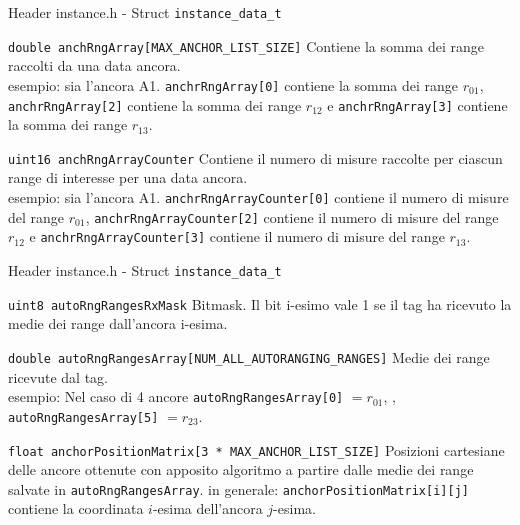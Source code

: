 \begin{frame}[fragile]{Header instance.h - Struct \lstinline!instance_data_t!}
  \begin{block}{\lstinline!double anchRngArray[MAX_ANCHOR_LIST_SIZE]!}
    Contiene la somma dei range raccolti da una data ancora.\\
    \textcolor{dgreen}{esempio:} sia l'ancora A1. \lstinline!anchrRngArray[0]! contiene la somma dei range $r_{01}$,
    \lstinline!anchrRngArray[2]! contiene la somma dei range $r_{12}$ e \lstinline!anchrRngArray[3]! contiene la somma dei range $r_{13}$.
  \end{block}
  \begin{block}{\lstinline!uint16 anchRngArrayCounter!}
    Contiene il numero di misure raccolte per ciascun range di interesse per una data ancora.\\
    \textcolor{dgreen}{esempio:} sia l'ancora A1. \lstinline!anchrRngArrayCounter[0]! contiene il numero di misure del range $r_{01}$,
    \lstinline!anchrRngArrayCounter[2]! contiene il numero di misure del range $r_{12}$ e \lstinline!anchrRngArrayCounter[3]! contiene il numero di misure del range $r_{13}$.
  \end{block}
\end{frame}

\begin{frame}[fragile]{Header instance.h - Struct \lstinline!instance_data_t!}
  \begin{block}{\lstinline!uint8 autoRngRangesRxMask!}
    Bitmask. Il bit i-esimo vale 1 se il tag ha ricevuto la medie dei range dall'ancora i-esima.
  \end{block}
  \begin{block}{\lstinline!double autoRngRangesArray[NUM_ALL_AUTORANGING_RANGES]!}
    Medie dei range ricevute dal tag.\\
    \textcolor{dgreen}{esempio:} Nel caso di 4 ancore \lstinline!autoRngRangesArray[0]! $ = r_{01}$,
    \hdots, \lstinline!autoRngRangesArray[5]! $ = r_{23}$.
  \end{block}
  \begin{block}{\lstinline!float anchorPositionMatrix[3 * MAX_ANCHOR_LIST_SIZE]!}
    Posizioni cartesiane delle ancore ottenute con apposito algoritmo a partire dalle medie dei range salvate
    in \lstinline!autoRngRangesArray!.
    \alert{in generale:} \lstinline!anchorPositionMatrix[i][j]! contiene la coordinata $i$-esima dell'ancora $j$-esima.
  \end{block}
\end{frame}


